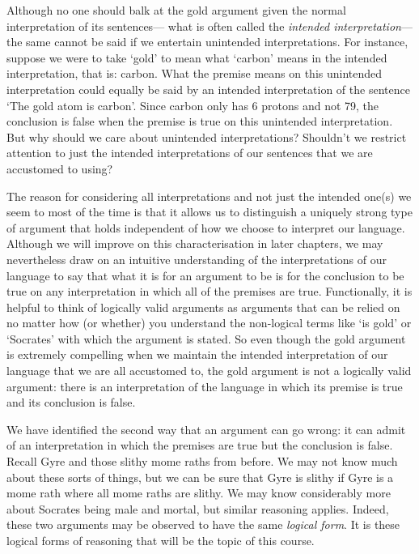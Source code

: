 Although no one should balk at the gold argument given the normal interpretation of its sentences--- what is often called the \textit{intended interpretation}--- the same cannot be said if we entertain unintended interpretations.
For instance, suppose we were to take `gold' to mean what `carbon' means in the intended interpretation, that is: carbon.
What the premise means on this unintended interpretation could equally be said by an intended interpretation of the sentence `The gold atom is carbon'.
Since carbon only has 6 protons and not 79, the conclusion is false when the premise is true on this unintended interpretation.
But why should we care about unintended interpretations?
Shouldn't we restrict attention to just the intended interpretations of our sentences that we are accustomed to using?

The reason for considering all interpretations and not just the intended one(s) we seem to most of the time is that it allows us to distinguish a uniquely strong type of argument that holds independent of how we choose to interpret our language.
Although we will improve on this characterisation in later chapters, we may nevertheless draw on an intuitive understanding of the interpretations of our language to say that what it is for an argument to be  is for the conclusion to be true on any interpretation in which all of the premises are true. 
Functionally, it is helpful to think of logically valid arguments as arguments that can be relied on no matter how (or whether) you understand the non-logical terms like `is gold' or `Socrates' with which the argument is stated.
So even though the gold argument is extremely compelling when we maintain the intended interpretation of our language that we are all accustomed to, the gold argument is not a logically valid argument: there is an interpretation of the language in which its premise is true and its conclusion is false.

We have identified the second way that an argument can go wrong: it can admit of an interpretation in which the premises are true but the conclusion is false.
Recall Gyre and those slithy mome raths from before.
We may not know much about these sorts of things, but we can be sure that Gyre is slithy if Gyre is a mome rath where all mome raths are slithy.
We may know considerably more about Socrates being male and mortal, but similar reasoning applies.
Indeed, these two arguments may be observed to have the same \textit{logical form}.
It is these logical forms of reasoning that will be the topic of this course.

